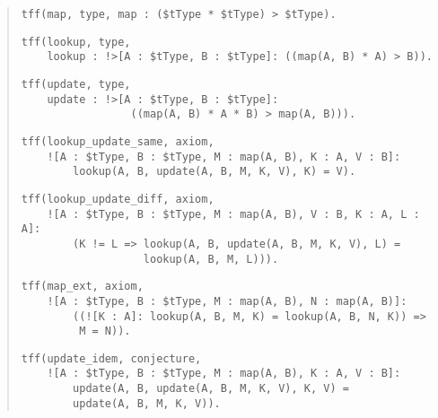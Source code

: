 \begin{quote}
\verb+tff(map, type, map : ($tType * $tType) > $tType).+
\par
\verb+tff(lookup, type,+\\
\verb+    lookup : !>[A : $tType, B : $tType]: ((map(A, B) * A) > B)).+\kern-10mm
\par
\pagebreak[1] %
\verb+tff(update, type,+\\
\verb+    update : !>[A : $tType, B : $tType]:+\\
\verb+                 ((map(A, B) * A * B) > map(A, B))).+
\par%
\pagebreak[2] %
\verb+tff(lookup_update_same, axiom,+\\
\verb+    ![A : $tType, B : $tType, M : map(A, B), K : A, V : B]:+\\
\verb+        lookup(A, B, update(A, B, M, K, V), K) = V).+
\par
\pagebreak[1] %
\verb+tff(lookup_update_diff, axiom,+\\
\verb+    ![A : $tType, B : $tType, M : map(A, B), V : B, K : A, L : A]:+\kern-10mm\\
\verb+        (K != L => lookup(A, B, update(A, B, M, K, V), L) =+\\
\verb+                   lookup(A, B, M, L))).+
\par
\pagebreak[1] %
\verb+tff(map_ext, axiom,+\\
\verb+    ![A : $tType, B : $tType, M : map(A, B), N : map(A, B)]:+\\
\verb+        ((![K : A]: lookup(A, B, M, K) = lookup(A, B, N, K)) =>+\kern-10mm\\
\verb+         M = N)).+
\par%
\pagebreak[2] %
\verb+tff(update_idem, conjecture,+\\
\verb+    ![A : $tType, B : $tType, M : map(A, B), K : A, V : B]:+\\
\verb+        update(A, B, update(A, B, M, K, V), K, V) =+\\
\verb+        update(A, B, M, K, V)).+
\end{quote}
